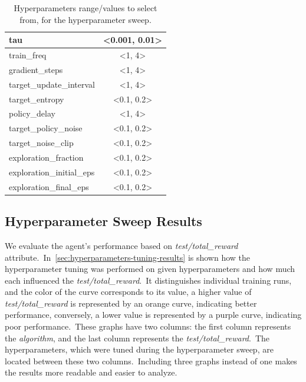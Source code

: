 \documentclass[../xlapes02]{subfiles}
\begin{document}
\begin{table}[H]
{\begin{tabular}{|l|c|}
                tau                       & <0.001, 0.01>                                   \\ \hline
                train\_freq               & <1, 4>                                          \\ \hline
                gradient\_steps           & <1, 4>                                          \\ \hline
                target\_update\_interval  & <1, 4>                                          \\ \hline
                target\_entropy           & <0.1, 0.2>                                      \\ \hline
                policy\_delay             & <1, 4>                                          \\ \hline
                target\_policy\_noise     & <0.1, 0.2>                                      \\ \hline
                target\_noise\_clip       & <0.1, 0.2>                                      \\ \hline
                exploration\_fraction     & <0.1, 0.2>                                      \\ \hline
                exploration\_initial\_eps & <0.1, 0.2>                                      \\ \hline
                exploration\_final\_eps   & <0.1, 0.2>                                      \\ \hline
            \end{tabular}
        }
        \caption{Hyperparameters range/values to select from, for the hyperparameter sweep.}
        \label{tab:hyperparameters}
    \end{table}

    \subsection{Hyperparameter Sweep Results}\label{subsec:hyperparameter_sweep_results}
    We evaluate the agent's performance based on \emph{test/total\_reward} attribute.\ In~\cref{sec:hyperparameters-tuning-results} is shown how the hyperparameter tuning was performed on given hyperparameters and how much each influenced the \emph{test/total\_reward}.\ It distinguishes individual training runs, and the color of the curve corresponds to its value, a higher value of \emph{test/total\_reward} is represented by an \textcolor[RGB]{255,128,0}{orange curve, indicating better performance}, conversely, a lower value is represented by a \textcolor[RGB]{100,0,200}{purple curve, indicating poor performance}.\ These graphs have two columns: the first column represents the \emph{algorithm}, and the last column represents the \emph{test/total\_reward}.\ The hyperparameters, which were tuned during the hyperparameter sweep, are located between these two columns.\ Including three graphs instead of one makes the results more readable and easier to analyze.
\end{document}
